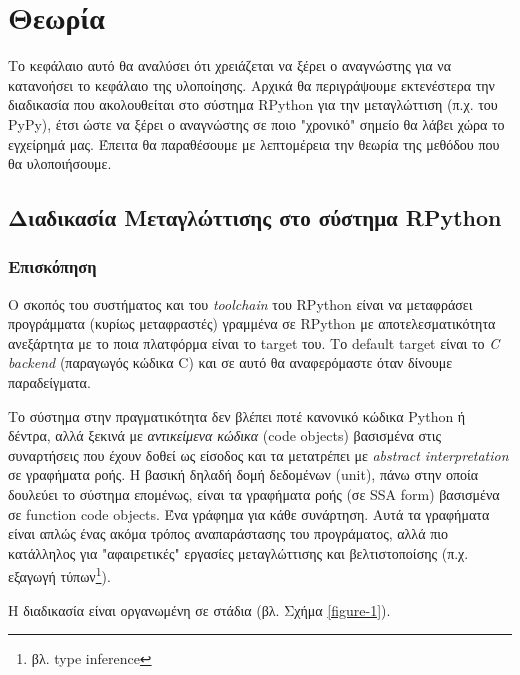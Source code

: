 
\chapter{Θεωρία}
\label{chapter3} 

Το κεφάλαιο αυτό θα αναλύσει ότι χρειάζεται να ξέρει ο αναγνώστης για να
κατανοήσει το κεφάλαιο της υλοποίησης. Αρχικά θα περιγράψουμε εκτενέστερα την
διαδικασία που ακολουθείται στο σύστημα RPython για την μεταγλώττιση (π.χ. του
PyPy), έτσι ώστε να ξέρει ο αναγνώστης σε ποιο "χρονικό" σημείο θα λάβει χώρα το
εγχείρημά μας. Έπειτα θα παραθέσουμε με λεπτομέρεια την θεωρία της μεθόδου που
θα υλοποιήσουμε.


\section{Διαδικασία Μεταγλώττισης στο σύστημα RPython}

\subsection{Επισκόπηση}

Ο σκοπός του συστήματος και του \textit{toolchain} του RPython είναι να
μεταφράσει προγράμματα (κυρίως μεταφραστές) γραμμένα σε RPython με
αποτελεσματικότητα ανεξάρτητα με το ποια πλατφόρμα είναι το target του. Το
default target είναι το \textit{C backend} (παραγωγός κώδικα C) και σε αυτό θα
αναφερόμαστε όταν δίνουμε παραδείγματα.

Το σύστημα στην πραγματικότητα δεν βλέπει ποτέ κανονικό κώδικα Python ή
δέντρα, αλλά ξεκινά με \textit{αντικείμενα κώδικα} (code objects) βασισμένα
στις συναρτήσεις που έχουν δοθεί ως είσοδος και τα μετατρέπει με
\textit{abstract interpretation}\cite{CousotCousot77}\cite{debray1995abstract}
σε γραφήματα ροής. Η βασική δηλαδή δομή δεδομένων (unit), πάνω στην οποία
δουλεύει το σύστημα επομένως, είναι τα γραφήματα ροής (σε SSA\cite{ssa} form)
βασισμένα σε function code objects. Ένα γράφημα για κάθε συνάρτηση. Αυτά τα
γραφήματα είναι απλώς ένας ακόμα τρόπος αναπαράστασης του προγράματος, αλλά
πιο κατάλληλος για "αφαιρετικές" εργασίες μεταγλώττισης και βελτιστοποίσης
(π.χ. εξαγωγή τύπων\footnote{βλ. type inference}).

Η διαδικασία είναι οργανωμένη σε στάδια (βλ. Σχήμα \ref{figure-1}).

